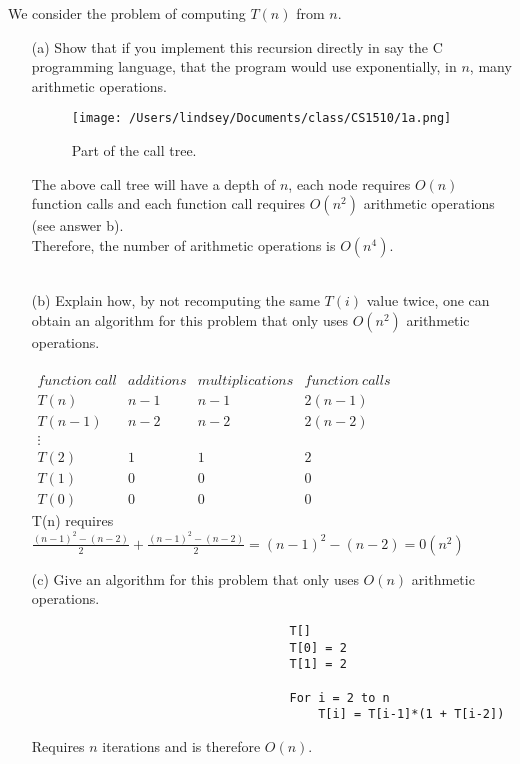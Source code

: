 \documentclass[10pt]{article}
\begin{document}
	\noindent
	We consider the problem of computing $T(n)$ from $n$.
	\begin{enumerate}
		\item[(a)] 	Show that if you implement this recursion directly in say the C programming language, that the
								program would use exponentially, in $n$, many arithmetic operations.
										\begin{figure}[h]
											\centering
												\texttt{[image: /Users/lindsey/Documents/class/CS1510/1a.png]}
											  \caption{Part of the call tree.}
										\end{figure}
										The above call tree will have a depth of $n$, each node requires $O(n)$ function calls and 
										each function call requires $O(n^2)$ arithmetic operations (see answer b).\\
										Therefore, the number of arithmetic operations is $O(n^4)$.\\
										\\
		\item[(b)] 	Explain how, by not recomputing the same $T(i)$ value twice, one can obtain an algorithm for this
								problem that only uses $O(n^2)$ arithmetic operations.
										\\
										\\
										$\begin{array}{cccc}
											function~call & additions & multiplications & function~calls\\
											T(n) & n-1 & n-1 & 2(n-1)\\
											T(n-1) & n-2 & n-2 & 2(n-2)\\
											\vdots \\
											T(2) & 1 & 1 & 2\\
											T(1) & 0 & 0 & 0\\
											T(0) & 0 & 0 & 0
										\end{array}$
										\\
										T(n) requires $\frac{(n-1)^2 - (n-2)}{2} + \frac{(n-1)^2 - (n-2)}{2} = (n-1)^2 - (n-2) = 0(n^2)$
		\item[(c)]	Give an algorithm for this problem that only uses $O(n)$ arithmetic operations.
								\begin{verbatim}
									T[]
									T[0] = 2
									T[1] = 2
									
									For i = 2 to n
									    T[i] = T[i-1]*(1 + T[i-2])								
								\end{verbatim}
								Requires $n$ iterations and is therefore $O(n)$.
	\end{enumerate}
\end{document}
